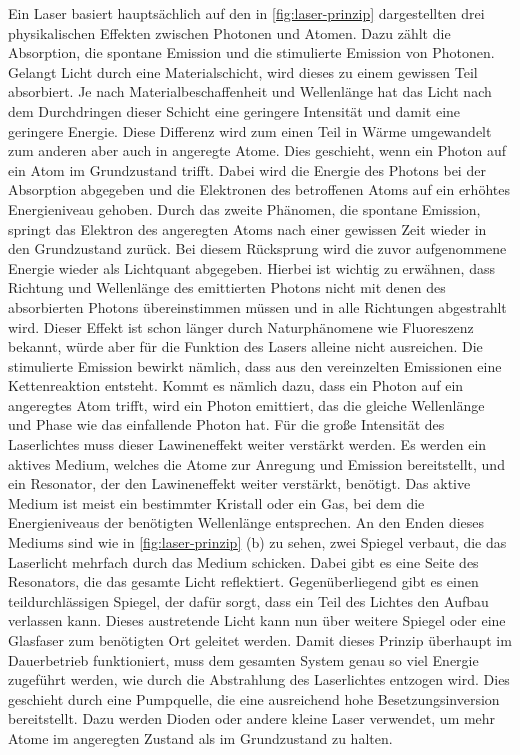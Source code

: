 Ein Laser basiert hauptsächlich auf den in \cref{fig:laser-prinzip} dargestellten drei physikalischen Effekten zwischen Photonen und Atomen. Dazu zählt die Absorption, die spontane Emission und
die stimulierte Emission von Photonen. Gelangt Licht durch eine Materialschicht, wird dieses zu einem
gewissen Teil absorbiert. Je nach Materialbeschaffenheit und Wellenlänge hat das Licht nach dem Durchdringen dieser Schicht eine geringere
Intensität und damit eine geringere Energie. Diese Differenz wird zum einen Teil in Wärme umgewandelt zum anderen aber auch in angeregte Atome.
Dies geschieht, wenn ein Photon auf ein Atom im Grundzustand trifft. Dabei wird die Energie des Photons bei der Absorption abgegeben und die
Elektronen des betroffenen Atoms auf ein erhöhtes Energieniveau gehoben. Durch das zweite Phänomen, die spontane Emission, springt das Elektron
des angeregten Atoms nach einer gewissen Zeit wieder in den Grundzustand zurück. Bei diesem Rücksprung wird die zuvor aufgenommene Energie
wieder als Lichtquant abgegeben. Hierbei ist wichtig zu erwähnen, dass Richtung und Wellenlänge des emittierten Photons nicht mit denen des
absorbierten Photons übereinstimmen müssen und in alle Richtungen abgestrahlt wird. Dieser Effekt ist schon länger durch Naturphänomene wie Fluoreszenz bekannt, würde aber für die Funktion
des Lasers alleine nicht ausreichen. Die stimulierte Emission bewirkt nämlich, dass aus den vereinzelten Emissionen eine Kettenreaktion entsteht. Kommt
es nämlich dazu, dass ein Photon auf ein angeregtes Atom trifft, wird ein Photon emittiert, das die gleiche Wellenlänge und Phase wie das einfallende
Photon hat. Für die große Intensität des Laserlichtes muss dieser Lawineneffekt weiter verstärkt werden. Es werden ein aktives Medium,
welches die Atome zur Anregung und Emission bereitstellt, und ein Resonator, der den Lawineneffekt weiter verstärkt, benötigt. Das aktive Medium ist
meist ein bestimmter Kristall oder ein Gas, bei dem die Energieniveaus der benötigten Wellenlänge entsprechen. An den Enden dieses Mediums
sind wie in \cref{fig:laser-prinzip} (b) zu sehen, zwei Spiegel verbaut, die das Laserlicht mehrfach durch das Medium schicken. Dabei gibt es eine
Seite des Resonators, die das gesamte Licht reflektiert. Gegenüberliegend gibt es einen teildurchlässigen Spiegel, der dafür sorgt, dass ein Teil
des Lichtes den Aufbau verlassen kann. Dieses austretende Licht kann nun über weitere Spiegel oder eine Glasfaser zum benötigten Ort geleitet
werden. Damit dieses Prinzip überhaupt im Dauerbetrieb funktioniert, muss dem gesamten System genau so viel Energie zugeführt werden, wie
durch die Abstrahlung des Laserlichtes entzogen wird. Dies geschieht durch eine Pumpquelle, die eine ausreichend hohe Besetzungsinversion bereitstellt.
Dazu werden Dioden oder andere kleine Laser verwendet, um mehr Atome im angeregten Zustand als im Grundzustand zu halten.

